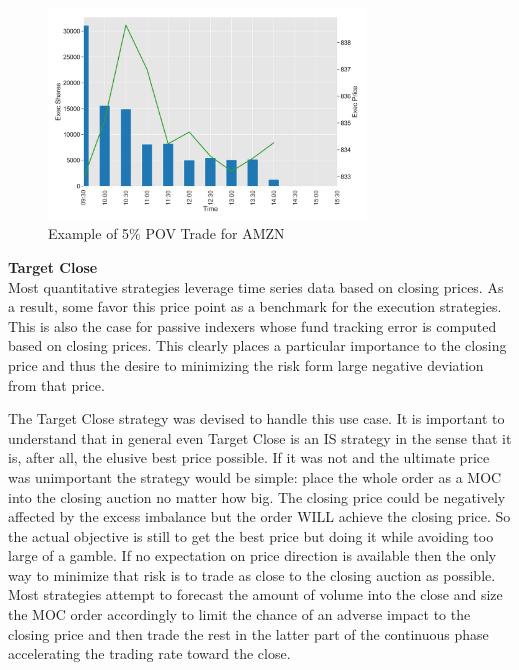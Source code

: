 	\begin{figure}[!ht]
	\centering
	\includegraphics[width=0.75\textwidth]{chapters/chapter_exec_models/figures/pov.png} 
	\caption{Example of 5\% POV Trade for AMZN \label{fig:pov}}
	\end{figure}


\noindent\textbf{Target Close} \\


Most quantitative strategies leverage time series data based on closing prices. As a result, some favor this price point as a benchmark for the execution strategies. This is also the case for passive indexers whose fund tracking error is computed based on closing prices. This clearly places a particular importance to the closing price and thus the desire to minimizing the risk form large negative deviation from that price.


The Target Close strategy was devised to handle this use case. It is important to understand that in general even Target Close is an IS strategy in the sense that it is, after all, the elusive best price possible. If it was not and the ultimate price was unimportant the strategy would be simple: place the whole order as a MOC into the closing auction no matter how big. The closing price could be negatively affected by the excess imbalance but the order WILL achieve the closing price. So the actual objective is still to get the best price but doing it while avoiding too large of a gamble. If no expectation on price direction is available then the only way to minimize that risk is to trade as close to the closing auction as possible. Most strategies attempt to forecast the amount of volume into the close and size the MOC order accordingly to limit the chance of an adverse impact to the closing price and then trade the rest in the latter part of the continuous phase accelerating the trading rate toward the close. \\


